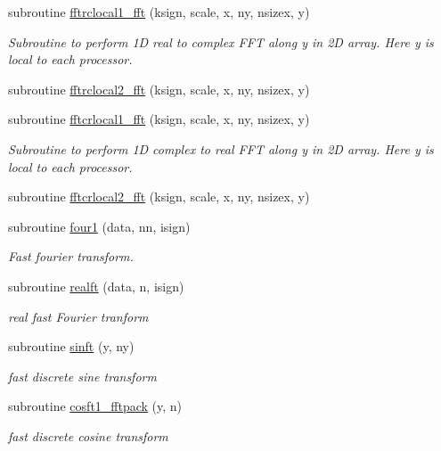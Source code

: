 \begin{DoxyCompactItemize}
subroutine \mbox{\hyperlink{namespacefftclass_af33a24fc1bf4d5763c335c0cef247e3c}{fftrclocal1\+\_\+fft}} (ksign, scale, x, ny, nsizex, y)
\begin{DoxyCompactList}\small\item\em Subroutine to perform 1D real to complex F\+FT along y in 2D array. Here y is local to each processor. \end{DoxyCompactList}\item 
subroutine \mbox{\hyperlink{namespacefftclass_a83a1c8ccf853ae07fdfc5a80e1e244d1}{fftrclocal2\+\_\+fft}} (ksign, scale, x, ny, nsizex, y)
\item 
subroutine \mbox{\hyperlink{namespacefftclass_a25ecfa928dd28501b9c251c1e887996b}{fftcrlocal1\+\_\+fft}} (ksign, scale, x, ny, nsizex, y)
\begin{DoxyCompactList}\small\item\em Subroutine to perform 1D complex to real F\+FT along y in 2D array. Here y is local to each processor. \end{DoxyCompactList}\item 
subroutine \mbox{\hyperlink{namespacefftclass_a62d05d7b0980c823708d03f4a1520c1e}{fftcrlocal2\+\_\+fft}} (ksign, scale, x, ny, nsizex, y)
\item 
subroutine \mbox{\hyperlink{namespacefftclass_a4597d420a1363f9fd0b652472d7caf52}{four1}} (data, nn, isign)
\begin{DoxyCompactList}\small\item\em Fast fourier transform. \end{DoxyCompactList}\item 
subroutine \mbox{\hyperlink{namespacefftclass_a1aec6e8023ec23ff926a64c54c93ee1e}{realft}} (data, n, isign)
\begin{DoxyCompactList}\small\item\em real fast Fourier tranform \end{DoxyCompactList}\item 
subroutine \mbox{\hyperlink{namespacefftclass_abcd5ef700f07a29fa9949e15866f5d41}{sinft}} (y, ny)
\begin{DoxyCompactList}\small\item\em fast discrete sine transform \end{DoxyCompactList}\item 
subroutine \mbox{\hyperlink{namespacefftclass_ac4347b89b0b1a5894943daa3f37c54ee}{cosft1\+\_\+fftpack}} (y, n)
\begin{DoxyCompactList}\small\item\em fast discrete cosine transform \end{DoxyCompactList}\item 

\end{DoxyCompactItemize}
